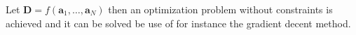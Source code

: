 Let $\textbf{D} = f(\textbf{a}_1, \hdots, \textbf{a}_N)$ then an optimization problem without constraints is achieved and it can be solved be use of for instance the gradient decent method.

   


